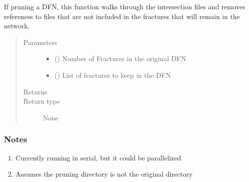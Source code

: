 \documentclass[letterpaper,10pt,english]{sphinxmanual}
\begin{document}

\begin{fulllineitems}
\label{\detokenize{pydfnworks:pydfnworks.dfnGen.lagrit_scripts.edit_intersection_files}}
If pruning a DFN, this function walks through the intersection files
and removes references to files that are not included in the
fractures that will remain in the network.
\begin{quote}\begin{description}
\item[{Parameters}] \leavevmode\begin{itemize}
\item {} 
 () \textendash{} Number of Fractures in the original DFN

\item {} 
 () \textendash{} List of fractures to keep in the DFN

\end{itemize}

\item[{Returns}] \leavevmode


\item[{Return type}] \leavevmode
None

\end{description}\end{quote}
\subsubsection*{Notes}
\begin{enumerate}
\def\theenumi{\arabic{enumi}}
\def\labelenumi{\theenumi .}
\makeatletter\def\p@enumii{\p@enumi \theenumi .}\makeatother
\item {} 
Currently running in serial, but it could be parallelized

\item {} 
Assumes the pruning directory is not the original directory

\end{enumerate}

\end{fulllineitems}
\end{document}
